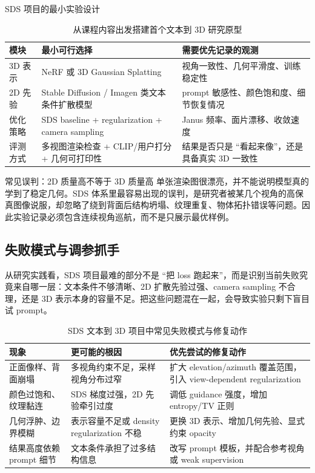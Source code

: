 \documentclass[a4paper]{article}
\begin{document}
\begin{knowledgebox}{SDS 项目的最小实验设计}
\begin{table}[H]
\centering
\begin{tabular}{p{} p{} p{}}
\toprule
模块 & 最小可行选择 & 需要优先记录的观测 \\
\midrule
3D 表示 & NeRF 或 3D Gaussian Splatting & 视角一致性、几何平滑度、训练稳定性 \\
2D 先验 & Stable Diffusion / Imagen 类文本条件扩散模型 & prompt 敏感性、颜色饱和度、细节恢复情况 \\
优化策略 & SDS baseline + regularization + camera sampling & Janus 频率、面片漂移、收敛速度 \\
评测方式 & 多视图渲染检查 + CLIP/用户打分 + 几何可打印性 & 结果是否只是 ``看起来像''，还是具备真实 3D 一致性 \\
\bottomrule
\end{tabular}
\caption{从课程内容出发搭建首个文本到 3D 研究原型}
\end{table}
\end{knowledgebox}

\begin{warningbox}{常见误判：2D 质量高不等于 3D 质量高}
单张渲染图很漂亮，并不能说明模型真的学到了稳定几何。SDS 体系里最容易出现的误判，是研究者被某几个视角的高保真图像说服，却忽略了绕到背面后结构坍塌、纹理重复、物体拓扑错误等问题。因此实验记录必须包含连续视角巡航，而不是只展示最优样例。
\end{warningbox}

\subsection{失败模式与调参抓手}

从研究实践看，SDS 项目最难的部分不是 ``把 loss 跑起来''，而是识别当前失败究竟来自哪一层：文本条件不够清晰、2D 扩散先验过强、camera sampling 不合理，还是 3D 表示本身的容量不足。把这些问题混在一起，会导致实验只剩下盲目试 prompt。

\begin{table}[H]
\centering
\begin{tabular}{p{} p{} p{}}
\toprule
现象 & 更可能的根因 & 优先尝试的修复动作 \\
\midrule
正面像样、背面崩塌 & 多视角约束不足，采样视角分布过窄 & 扩大 elevation/azimuth 覆盖范围，引入 view-dependent regularization \\
颜色过饱和、纹理黏连 & SDS 梯度过强，2D 先验牵引过度 & 调低 guidance 强度，增加 entropy/TV 正则 \\
几何浮肿、边界模糊 & 表示容量不足或 density regularization 不稳 & 更换 3D 表示、增加几何先验、显式约束 opacity \\
结果高度依赖 prompt 细节 & 文本条件承担了过多结构信息 & 改写 prompt 模板，并配合参考视角或 weak supervision \\
\bottomrule
\end{tabular}
\caption{SDS 文本到 3D 项目中常见失败模式与修复动作}
\end{table}
\end{document}

